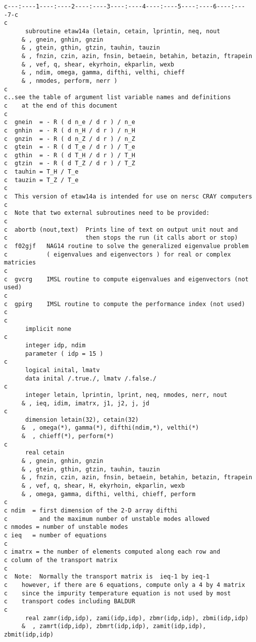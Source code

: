 \begin{verbatim}
c---:----1----:----2----:----3----:----4----:----5----:----6----:----7-c
c
      subroutine etaw14a (letain, cetain, lprintin, neq, nout
     & , gnein, gnhin, gnzin
     & , gtein, gthin, gtzin, tauhin, tauzin
     & , fnzin, czin, azin, fnsin, betaein, betahin, betazin, ftrapein
     & , vef, q, shear, ekyrhoin, ekparlin, wexb
     & , ndim, omega, gamma, difthi, velthi, chieff
     & , nmodes, perform, nerr )
c
c..see the table of argument list variable names and definitions
c    at the end of this document
c
c  gnein  = - R ( d n_e / d r ) / n_e
c  gnhin  = - R ( d n_H / d r ) / n_H
c  gnzin  = - R ( d n_Z / d r ) / n_Z
c  gtein  = - R ( d T_e / d r ) / T_e
c  gthin  = - R ( d T_H / d r ) / T_H
c  gtzin  = - R ( d T_Z / d r ) / T_Z
c  tauhin = T_H / T_e
c  tauzin = T_Z / T_e
c
c  This version of etaw14a is intended for use on nersc CRAY computers
c
c  Note that two external subroutines need to be provided:
c
c  abortb (nout,text)  Prints line of text on output unit nout and
c                      then stops the run (it calls abort or stop)
c  f02gjf   NAG14 routine to solve the generalized eigenvalue problem
c           ( eigenvalues and eigenvectors ) for real or complex matricies
c
c  gvcrg    IMSL routine to compute eigenvalues and eigenvectors (not used)
c
c  gpirg    IMSL routine to compute the performance index (not used)
c
c
      implicit none
c
      integer idp, ndim
      parameter ( idp = 15 )
c
      logical inital, lmatv
      data inital /.true./, lmatv /.false./
c
      integer letain, lprintin, lprint, neq, nmodes, nerr, nout
     & , ieq, idim, imatrx, j1, j2, j, jd
c
      dimension letain(32), cetain(32)
     &  , omega(*), gamma(*), difthi(ndim,*), velthi(*)
     &  , chieff(*), perform(*)
c
      real cetain
     & , gnein, gnhin, gnzin
     & , gtein, gthin, gtzin, tauhin, tauzin
     & , fnzin, czin, azin, fnsin, betaein, betahin, betazin, ftrapein
     & , vef, q, shear, H, ekyrhoin, ekparlin, wexb
     & , omega, gamma, difthi, velthi, chieff, perform
c
c ndim  = first dimension of the 2-D array difthi
c         and the maximum number of unstable modes allowed
c nmodes = number of unstable modes
c ieq   = number of equations
c
c imatrx = the number of elements computed along each row and
c column of the transport matrix
c
c  Note:  Normally the transport matrix is  ieq-1 by ieq-1
c    however, if there are 6 equations, compute only a 4 by 4 matrix
c    since the impurity temperature equation is not used by most
c    transport codes including BALDUR
c
      real zamr(idp,idp), zami(idp,idp), zbmr(idp,idp), zbmi(idp,idp)
     &  , zamrt(idp,idp), zbmrt(idp,idp), zamit(idp,idp), zbmit(idp,idp)

\end{verbatim}
